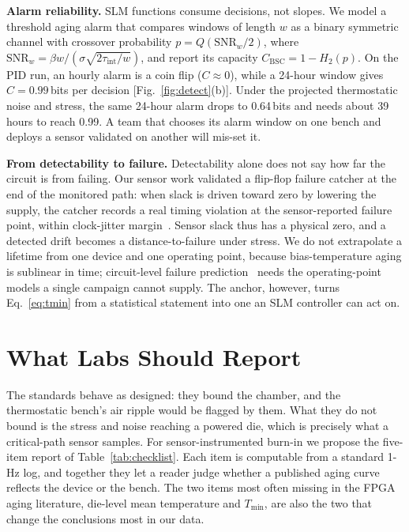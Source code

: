 \documentclass[10pt,twocolumn]{article}
\newcommand{\Tmin}{T_{\min}}
\newcommand{\tint}{\tau_{\mathrm{int}}}
\begin{document}
\textbf{Alarm reliability.} SLM functions consume decisions, not slopes. We model a threshold aging alarm that compares windows of length $w$ as a binary symmetric channel with crossover probability $p=Q(\mathrm{SNR}_w/2)$, where $\mathrm{SNR}_w=\beta w/(\sigma\sqrt{2\tint/w})$, and report its capacity $C_{\mathrm{BSC}}=1-H_2(p)$. On the PID run, an hourly alarm is a coin flip ($C\approx0$), while a 24-hour window gives $C=0.99$\,bits per decision [Fig.~\ref{fig:detect}(b)]. Under the projected thermostatic noise and stress, the same 24-hour alarm drops to 0.64\,bits and needs about 39 hours to reach 0.99. A team that chooses its alarm window on one bench and deploys a sensor validated on another will mis-set it.

\textbf{From detectability to failure.} Detectability alone does not say how far the circuit is from failing. Our sensor work validated a flip-flop failure catcher at the end of the monitored path: when slack is driven toward zero by lowering the supply, the catcher records a real timing violation at the sensor-reported failure point, within clock-jitter margin~\cite{sbcci25}. Sensor slack thus has a physical zero, and a detected drift becomes a distance-to-failure under stress. We do not extrapolate a lifetime from one device and one operating point, because bias-temperature aging is sublinear in time; circuit-level failure prediction~\cite{agarwal} needs the operating-point models a single campaign cannot supply. The anchor, however, turns Eq.~\eqref{eq:tmin} from a statistical statement into one an SLM controller can act on.

\section{What Labs Should Report}

The standards behave as designed: they bound the chamber, and the thermostatic bench's air ripple would be flagged by them. What they do not bound is the stress and noise reaching a powered die, which is precisely what a critical-path sensor samples. For sensor-instrumented burn-in we propose the five-item report of Table~\ref{tab:checklist}. Each item is computable from a standard 1-Hz log, and together they let a reader judge whether a published aging curve reflects the device or the bench. The two items most often missing in the FPGA aging literature, die-level mean temperature and $\Tmin$, are also the two that change the conclusions most in our data.
\end{document}
